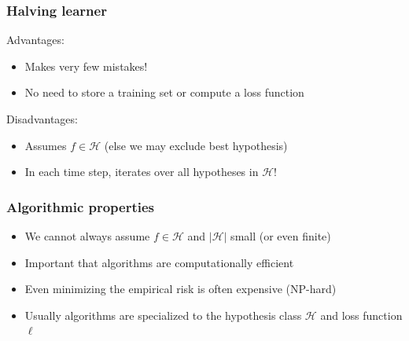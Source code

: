 \documentclass[10pt]{beamer}
\begin{document}
\begin{frame}
  \frametitle{Halving learner}
  Advantages:
  \begin{itemize}
	\item Makes very few mistakes!
	\item No need to store a training set or compute a loss function
  \end{itemize}
  Disadvantages:
  \begin{itemize}
	\item Assumes $f\in\mathcal{H}$ (else we may exclude best hypothesis)
	\item In each time step, iterates over all hypotheses in $\mathcal{H}$!
  \end{itemize}
\end{frame}

\begin{frame}
  \frametitle{Algorithmic properties}

  \begin{center}
  \end{center}

  \vspace*{1cm}

  \begin{itemize}
	\item We cannot always assume $f\in\mathcal{H}$ and $|\mathcal{H}|$ small (or even finite)
	\item Important that algorithms are computationally {\color{green} efficient}
	\item Even minimizing the empirical risk is often expensive (NP-hard)
	\item Usually algorithms are {\color{red} specialized} to the hypothesis class $\mathcal{H}$ and loss function $\ell$
  \end{itemize}
\end{frame}
\end{document}
